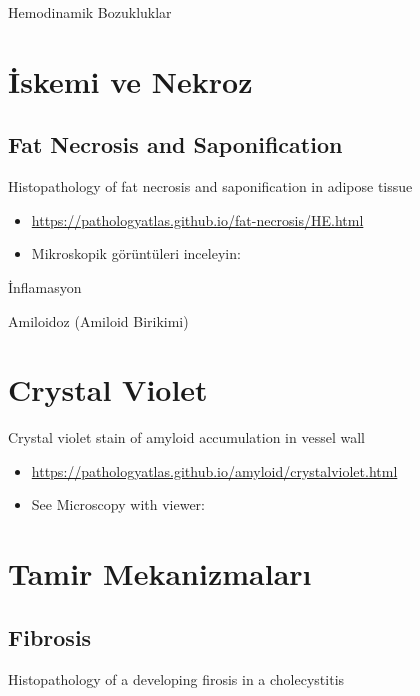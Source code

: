 \documentclass[
  letterpaper,
  DIV=11,
  numbers=noendperiod]{scrreprt}
\begin{document}
Hemodinamik Bozukluklar

\hypertarget{iskemi-ve-nekroz}{%
\chapter{İskemi ve Nekroz}\label{iskemi-ve-nekroz}}

\hypertarget{fat-necrosis-and-saponification}{%
\section{Fat Necrosis and
Saponification}\label{fat-necrosis-and-saponification}}

Histopathology of fat necrosis and saponification in adipose tissue

\begin{itemize}
\item
  \url{https://pathologyatlas.github.io/fat-necrosis/HE.html}
\item
  Mikroskopik görüntüleri inceleyin:
\end{itemize}

İnflamasyon

Amiloidoz (Amiloid Birikimi)

\hypertarget{crystal-violet}{%
\chapter{Crystal Violet}\label{crystal-violet}}

Crystal violet stain of amyloid accumulation in vessel wall

\begin{itemize}
\item
  \url{https://pathologyatlas.github.io/amyloid/crystalviolet.html}
\item
  See Microscopy with viewer:
\end{itemize}

\hypertarget{tamir-mekanizmalarux131}{%
\chapter{Tamir Mekanizmaları}\label{tamir-mekanizmalarux131}}

\hypertarget{fibrosis}{%
\section{Fibrosis}\label{fibrosis}}

Histopathology of a developing firosis in a cholecystitis
\end{document}

